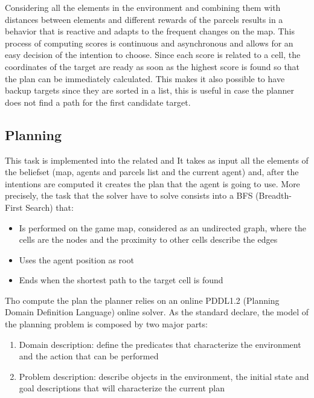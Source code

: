 \documentclass[a4paper, 11pt]{article}
\begin{document}
Considering all the elements in the environment and combining them with distances between elements and different rewards of the parcels results in a behavior that is reactive and adapts to the frequent changes on the map. This process of computing scores is continuous and asynchronous and allows for an easy decision of the intention to choose. Since each score is related to a cell, the coordinates of the target are ready as soon as the highest score is found so that the plan can be immediately calculated. This makes it also possible to have backup targets since they are sorted in a list, this is useful in case the planner does not find a path for the first candidate target.

\subsection{Planning}

This task is implemented into the related and It takes as input all the elements of the beliefset (map, agents and parcels list and the current agent) and, after the intentions are computed it creates the plan that the agent is going to use.
More precisely, the task that the solver have to solve consists into a BFS (Breadth-First Search) that:
\begin{itemize}
    \item Is performed on the game map, considered as an undirected graph, where the cells are the nodes and the proximity to other cells describe the edges
    \item Uses the agent position as root
    \item Ends when the shortest path to the target cell is found\\
\end{itemize}

Tho compute the plan the planner relies on an online PDDL1.2 (Planning Domain Definition Language) online solver. As the standard declare, the model of the planning problem is composed by two major parts:
\begin{enumerate}
    \item Domain description: define the predicates that characterize the environment and the action that can be performed
    \item Problem description: describe objects in the environment, the initial state and goal descriptions that will characterize the current plan\\
\end{enumerate}
\end{document}
